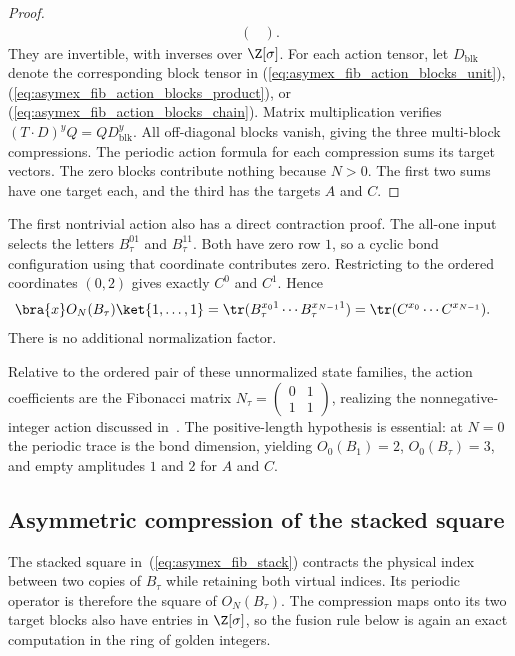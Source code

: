 \begin{proof}
\begin{align}
\begin{pmatrix}
               \end{pmatrix}.
    \end{align}
    They are invertible, with inverses over $\Z[\sigma]$.
    For each action tensor, let $D_{\mathrm{blk}}$ denote the
    corresponding block tensor in
    (\ref{eq:asymex_fib_action_blocks_unit}),
    (\ref{eq:asymex_fib_action_blocks_product}), or
    (\ref{eq:asymex_fib_action_blocks_chain}).
    Matrix multiplication verifies
    $(T\cdot D)^yQ=QD_{\mathrm{blk}}^y$.
    All off-diagonal blocks vanish, giving the three multi-block
    compressions. The periodic action formula for each compression
    sums its target vectors. The zero blocks contribute nothing
    because $N>0$. The first two sums have one target each, and the
    third has the targets $A$ and $C$.
\end{proof}

The first nontrivial action also has a direct contraction proof.
The all-one input selects the letters $B_\tau^{01}$ and
$B_\tau^{11}$. Both have zero row $1$, so a cyclic bond configuration
using that coordinate contributes zero. Restricting to the ordered
coordinates $(0,2)$ gives exactly $C^0$ and $C^1$. Hence
\begin{align}
    \bra{x}O_N(B_\tau)\ket{1,\ldots,1}
     & =\tr(B_\tau^{x_0 1}\cdots B_\tau^{x_{N-1}1})
    =\tr(C^{x_0}\cdots C^{x_{N-1}}).
\end{align}
There is no additional normalization factor.

Relative to the ordered pair of these unnormalized state families,
the action coefficients are the Fibonacci matrix
$N_\tau=\begin{pmatrix}0&1\\1&1\end{pmatrix}$, realizing the nonnegative-integer
action discussed in~\cite{GarreRubio2023MPOSym}.
The positive-length hypothesis is essential: at $N=0$ the periodic trace is the
bond dimension, yielding $O_0(B_1)=2$, $O_0(B_\tau)=3$, and empty amplitudes
$1$ and $2$ for $A$ and $C$.

\subsection{Asymmetric compression of the stacked square}

The stacked square in~(\ref{eq:asymex_fib_stack}) contracts the physical
index between two copies of $B_\tau$ while retaining both virtual
indices. Its periodic operator is therefore the square of
$O_N(B_\tau)$. The compression maps onto its two target blocks also
have entries in $\Z[\sigma]$, so the fusion rule below is again an
exact computation in the ring of golden integers.

